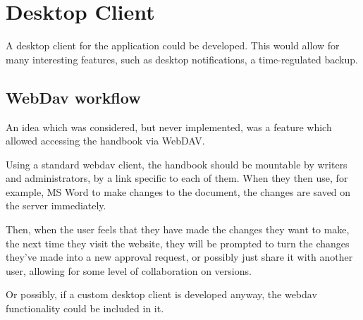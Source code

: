 \documentclass[../../master.tex]{subfiles}
\begin{document}
\section{Desktop Client}
A desktop client for the application could be developed. This would allow for many interesting features, such as desktop notifications, a time-regulated backup.
\subsection{WebDav workflow}
An idea which was considered, but never implemented, was a feature which allowed accessing the handbook via WebDAV.

Using a standard webdav client, the handbook should be mountable by writers and administrators, by a link specific to each of them. When they then use, for example, MS Word to make changes to the document, the changes are saved on the server immediately.

Then, when the user feels that they have made the changes they want to make, the next time they visit the website, they will be prompted to turn the changes they've made into a new approval request, or possibly just share it with another user, allowing for some level of collaboration on versions.

Or possibly, if a custom desktop client is developed anyway, the webdav functionality could be included in it.
\end{document}
